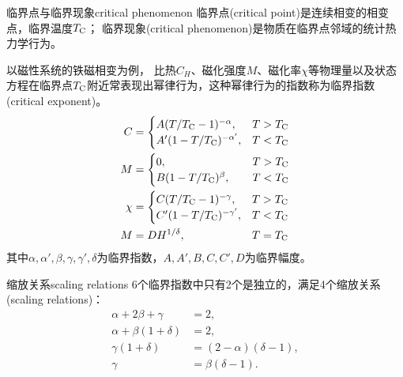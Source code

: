 \begin{definition}
	{临界点与临界现象}{critical phenomenon}
	临界点(critical point)是连续相变的相变点，临界温度$T_{\mathrm{C}}$；
	临界现象(critical phenomenon)是物质在临界点邻域的统计热力学行为。

	以磁性系统的铁磁相变为例，
	比热$C_H$、磁化强度$M$、磁化率$\chi$等物理量以及状态方程在临界点$T_{\mathrm{C}}$附近常表现出幂律行为，这种幂律行为的指数称为临界指数(critical exponent)。
	\begin{subequations}
		\begin{align}
			C&=\begin{cases}
				A(T/T_{\mathrm{C}}-1)^{-\alpha}, & T>T_{\mathrm{C}} \\
				A'(1-T/T_{\mathrm{C}})^{-\alpha'}, & T<T_{\mathrm{C}}
			\end{cases}\\
			M&=\begin{cases}
				0, & T>T_{\mathrm{C}} \\
				B(1-T/T_{\mathrm{C}})^{\beta},\phantom{\quad} & T<T_{\mathrm{C}}
			\end{cases}\\
			\chi&=\begin{cases}
				C(T/T_{\mathrm{C}}-1)^{-\gamma}, & T>T_{\mathrm{C}} \\
				C'(1-T/T_{\mathrm{C}})^{-\gamma'}, & T<T_{\mathrm{C}}
			\end{cases}\\
			M&=DH^{1/\delta},\qquad\qquad\qquad T=T_{\mathrm{C}}
		\end{align}
	\end{subequations}
	其中$\alpha,\alpha',\beta,\gamma,\gamma',\delta$为临界指数，$A,A',B,C,C',D$为临界幅度。
\end{definition}

\begin{theorem}
	{缩放关系}{scaling relations}
	6个临界指数中只有2个是独立的，满足4个缩放关系(scaling relations)：
	\begin{subequations}
		\begin{align}
			\alpha+2\beta+\gamma&=2,\\
			\alpha+\beta(1+\delta)&=2,\\
			\gamma(1+\delta)&=(2-\alpha)(\delta-1),\\
			\gamma&=\beta(\delta-1).
		\end{align}
	\end{subequations}
\end{theorem}

